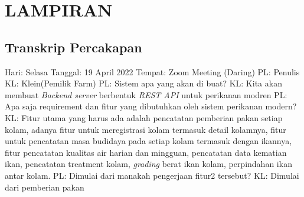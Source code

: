 \appendix
\chapter {LAMPIRAN}
\section {Transkrip Percakapan}
\begin{flushleft}
Hari: Selasa
\linebreak
Tanggal: 19 April 2022
\linebreak
Tempat: Zoom Meeting (Daring)
\linebreak
PL: Penulis
\linebreak
KL: Klein(Pemilik Farm)
\linebreak
\linebreak
PL: Sistem apa yang akan di buat?
\linebreak
KL: Kita akan membuat \textit{Backend server} berbentuk \textit{REST API} untuk perikanan modren
\linebreak
PL: Apa saja requirement dan fitur yang dibutuhkan oleh sistem perikanan modern?
\linebreak
KL: Fitur utama yang harus ada adalah pencatatan pemberian pakan setiap kolam, adanya fitur untuk meregistrasi kolam termasuk detail kolamnya, fitur untuk pencatatan masa budidaya pada setiap kolam termasuk dengan ikannya, fitur pencatatan kualitas air harian dan mingguan, pencatatan data kematian ikan, pencatatan treatment kolam, \emph{grading} berat ikan kolam, perpindahan ikan antar kolam.
\linebreak
PL: Dimulai dari manakah pengerjaan fitur2 tersebut?
\linebreak
KL: Dimulai dari pemberian pakan
\end{flushleft}